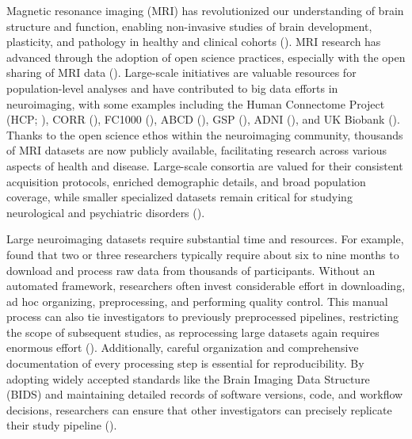 Magnetic resonance imaging (MRI) has revolutionized our understanding of brain structure and function,
enabling non-invasive studies of brain development, plasticity, and pathology in healthy and clinical cohorts (\cite{katti2011magnetic, mills2014methods}). 
MRI research has advanced through the adoption of open science practices, especially 
with the open sharing of MRI data (\cite{snoek2021amsterdam, van2013wu, miller2016multimodal, di2014autism}).
Large-scale initiatives are valuable resources for population-level analyses 
and have contributed to big data efforts in neuroimaging, with some examples including the 
Human Connectome Project (HCP; \cite{van2013wu}), CORR (\cite{gorgolewski2017preprocessed}), 
FC1000 (\cite{biswal2010toward}), ABCD (\cite{casey2018adolescent}), GSP (\cite{holmes2015brain}), ADNI (\cite{mueller2005alzheimer}), 
and UK Biobank (\cite{miller2016multimodal}). 
Thanks to the open science ethos within the neuroimaging community, thousands of MRI datasets are now publicly available, 
facilitating research across various aspects of health and disease. 
Large-scale consortia are valued for their consistent acquisition protocols, 
enriched demographic details, and broad population coverage, 
while smaller specialized datasets remain critical for studying neurological and psychiatric disorders 
(\cite{soler2022brain, fajardo2024functional, gibson2024aphasia}). 

Large neuroimaging datasets require substantial time and resources. 
For example, \cite{horien2021hitchhiker} found that two or three researchers typically 
require about six to nine months to download and process raw data from thousands of participants. 
Without an automated framework, researchers often invest considerable effort in downloading, 
ad hoc organizing, preprocessing, and performing quality control. 
This manual process can also tie investigators to previously preprocessed pipelines, 
restricting the scope of subsequent studies, as reprocessing large datasets again 
requires enormous effort (\cite{horien2021hitchhiker}). 
Additionally, careful organization and comprehensive documentation of every processing step is essential for reproducibility. 
By adopting widely accepted standards like the Brain Imaging Data Structure (BIDS) and 
maintaining detailed records of software versions, code, and workflow decisions, 
researchers can ensure that other investigators can precisely replicate their study pipeline (\cite{white2022data, horien2021hitchhiker}). 

